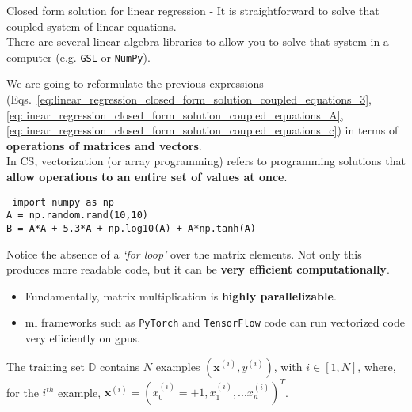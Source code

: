 \begin{frame}[t,allowframebreaks]{Closed form solution for linear regression -}
    It is straightforward to solve that coupled system of linear equations.\\
    \vspace{0.3cm}
    There are several linear algebra libraries to allow you to solve that 
    system in a computer (e.g. {\tt GSL} or {\tt NumPy}).\\

    \framebreak


    We are going to reformulate the previous expressions
    (Eqs.~\ref{eq:linear_regression_closed_form_solution_coupled_equations_3},
    \ref{eq:linear_regression_closed_form_solution_coupled_equations_A},
    \ref{eq:linear_regression_closed_form_solution_coupled_equations_c}) 
    in terms of {\bf operations of matrices and vectors}.\\
    \vspace{0.2cm}
    In CS, \gls{vectorization}
    (or \gls{array programming}) 
    refers to programming solutions that 
    {\bf allow operations to an entire set of values at once}.\\

    \begin{blockexample}{}
        \small \tt
        import numpy as np\\
        \vspace{0.4cm}
        A = np.random.rand(10,10)\\
        B = A*A + 5.3*A + np.log10(A) + A*np.tanh(A)\\
    \end{blockexample}  

    Notice the absence of a {\em `for loop'} over the matrix elements.
    Not only this produces more readable code, 
    but it can be {\bf very efficient computationally}.
    \begin{itemize}
        \item Fundamentally, matrix multiplication is {\bf highly parallelizable}. 
        \item \gls{ml} frameworks such as {\tt PyTorch} and {\tt TensorFlow} 
              code can run vectorized code very efficiently on \glspl{gpu}.
    \end{itemize}

    \framebreak


    The training set $\mathbb{D}$ contains $N$ examples 
    $(\mathbf{x}^{(i)},y^{(i)})$, with $i \in [1,N]$,
    where, for the $i^{th}$ example, 
    $\mathbf{x}^{(i)}=(x_0^{(i)}=+1, x_1^{(i)},...x_{n}^{(i)})^T$.\\
    \vspace{0.2cm}
        

\end{frame}
